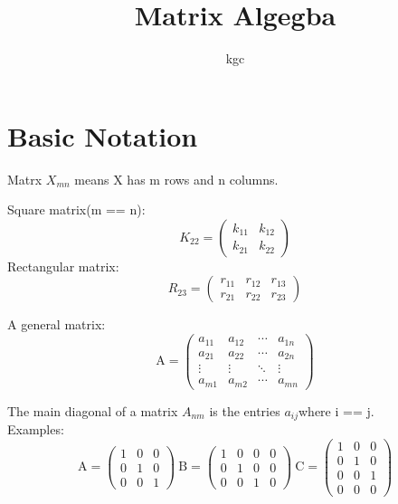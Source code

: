\documentclass[a4paper,10pt]{article}
\begin{document}
\title{Matrix Algegba}
\author{kgc}
\maketitle

\section{Basic Notation}
Matrx $X_{mn}$ means X has m rows and n columns.

Square matrix(m == n):
\[
K_{22} = \begin{pmatrix}

k_{11} & k_{12} \\

k_{21} & k_{22}

\end{pmatrix}
\]
Rectangular matrix:
\[
R_{23} = \begin{pmatrix}

r_{11} & r_{12} & r_{13} \\

r_{21} & r_{22} & r_{23}

\end{pmatrix}
\]


A general matrix:
\[
\text{A} = \begin{pmatrix}

a_{11} & a_{12} & \cdots & a_{1n} \\

a_{21} & a_{22} & \cdots & a_{2n} \\

\vdots & \vdots & \ddots & \vdots \\

a_{m1} & a_{m2} & \cdots & a_{mn}

\end{pmatrix}
\]

The main diagonal of a matrix $A_{nm}$ is the entries $a_{ij}$where i == j.\\
Examples:
\[
\text{A} = \begin{pmatrix}
1 & 0 & 0 \\

0 & 1 & 0 \\

0 & 0 & 1
\end{pmatrix}
%
\medspace\text{B} = \begin{pmatrix}
1 & 0 & 0 & 0 \\
0 & 1 & 0 & 0 \\
0 & 0 & 1 & 0 
\end{pmatrix}
%
\medspace\text{C} = \begin{pmatrix}
1 & 0 & 0 \\
0 & 1 & 0 \\
0 & 0 & 1 \\
0 & 0 & 0
\end{pmatrix}
\]
\end{document}
